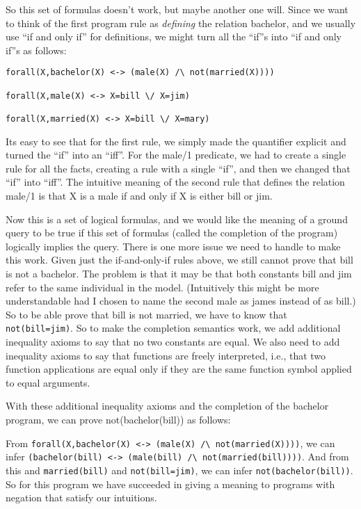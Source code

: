 So this set of formulas doesn't work, but maybe another one will.
Since we want to think of the first program rule as {\em defining} the
relation bachelor, and we usually use ``if and only if'' for
definitions, we might turn all the ``if''s into ``if and only if''s as
follows:
\begin{verbatim}
forall(X,bachelor(X) <-> (male(X) /\ not(married(X))))

forall(X,male(X) <-> X=bill \/ X=jim)

forall(X,married(X) <-> X=bill \/ X=mary)
\end{verbatim}
Its easy to see that for the first rule, we simply made the quantifier
explicit and turned the ``if'' into an ``iff''.  For the male/1
predicate, we had to create a single rule for all the facts, creating
a rule with a single ``if'', and then we changed that ``if'' into
``iff''.  The intuitive meaning of the second rule that defines the
relation male/1 is that X is a male if and only if X is either bill or
jim.

Now this is a set of logical formulas, and we would like the meaning
of a ground query to be true if this set of formulas (called the
completion of the program) logically implies the query.  There is one
more issue we need to handle to make this work.  Given just the
if-and-only-if rules above, we still cannot prove that bill is not a
bachelor.  The problem is that it may be that both constants bill and
jim refer to the same individual in the model.  (Intuitively this
might be more understandable had I chosen to name the second male as
james instead of as bill.)  So to be able prove that bill is not
married, we have to know that \verb|not(bill=jim)|.  So to make the
completion semantics work, we add additional inequality axioms to say
that no two constants are equal.  We also need to add inequality
axioms to say that functions are freely interpreted, i.e., that two
function applications are equal only if they are the same function
symbol applied to equal arguments.  

With these additional inequality axioms and the completion of the
bachelor program, we can prove not(bachelor(bill)) as follows:

From \verb|forall(X,bachelor(X) <-> (male(X) /\ not(married(X))))|, we
can infer 
\verb|(bachelor(bill) <-> (male(bill) /\ not(married(bill))))|.  
And from this and \verb|married(bill)| and
\verb|not(bill=jim)|, we can infer \verb|not(bachelor(bill))|.  So for
this program we have succeeded in giving a meaning to programs with
negation that satisfy our intuitions.

